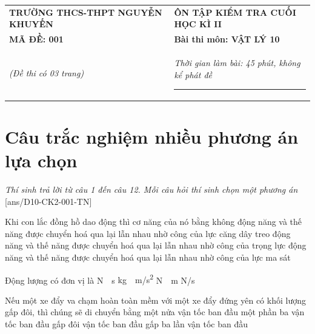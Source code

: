 \begin{center}
	\begin{tabular}{M{9.25cm}M{8.75cm}}
		\textbf{TRƯỜNG THCS-THPT NGUYỄN KHUYẾN}& \textbf{ÔN TẬP KIỂM TRA CUỐI HỌC KÌ II}\\
		\textbf{MÃ ĐỀ: 001}& \textbf{Bài thi môn: VẬT LÝ 10}\\
		\textit{(Đề thi có 03 trang)}& \textit{Thời gian làm bài: 45 phút, không kể phát đề}
		
		\noindent\rule{4cm}{0.8pt} \\
	\end{tabular}
\end{center}
\setcounter{section}{0}
\section{Câu trắc nghiệm nhiều phương án lựa chọn}
\textit{Thí sinh trả lời từ câu 1 đến câu 12. Mỗi câu hỏi thí sinh chọn một phương án}
\setcounter{ex}{0}
[ans/D10-CK2-001-TN]

\begin{ex}
	Khi con lắc đồng hồ dao động thì
	\choice
	{cơ năng của nó bằng không}
	{động năng và thế năng được chuyển hoá qua lại lẫn nhau nhờ công của lực căng dây treo}
	{\True động năng và thế năng được chuyển hoá qua lại lẫn nhau nhờ công của trọng lực}
	{động năng và thế năng được chuyển hoá qua lại lẫn nhau nhờ công của lực ma sát}
	\loigiai{}
\end{ex}
\begin{ex}
	Động lượng có đơn vị là
	\choice
	{\True \si{\newton\cdot\second}}
	{\si{\kilogram\cdot\meter/\second^2}}
	{\si{\newton\cdot\meter}}
	{\si{\newton/\second}}
	\loigiai{}
\end{ex}
\begin{ex}
	Nếu một xe đẩy va chạm hoàn toàn mềm với một xe đẩy đứng yên có khối lượng gấp đôi, thì chúng sẽ di chuyển bằng
	\choice
	{một nửa vận tốc ban đầu}
	{\True một phần ba vận tốc ban đầu}
	{gấp đôi vận tốc ban đầu}
	{gấp ba lần vận tốc ban đầu}
	\loigiai{}
\end{ex}

